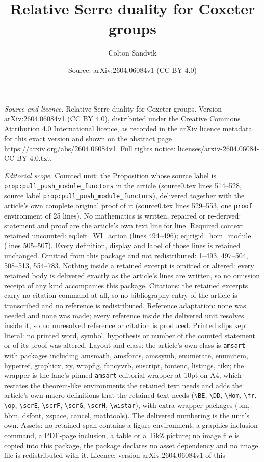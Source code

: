 \documentclass[10pt,a4paper]{amsart}
\title[Relative Serre duality for Coxeter groups]{Relative Serre duality for Coxeter groups}
\author{Colton Sandvik}
\date{Source: arXiv:2604.06084v1 (CC BY 4.0)}
\begin{document}
\maketitle

\noindent\emph{Source and licence.} Relative Serre duality for Coxeter groups. Version arXiv:2604.06084v1 (CC BY 4.0), distributed under the Creative Commons Attribution 4.0 International licence, as recorded in the arXiv licence metadata for this exact version and shown on the abstract page https://arxiv.org/abs/2604.06084v1. Full rights notice: licenses/arxiv-2604.06084-CC-BY-4.0.txt.\par\smallskip

\noindent\textit{Editorial scope.} Counted unit: the Proposition whose source label is \texttt{prop:pull\_push\_module\_functors} in the article (source0.tex lines 514--528, source label \texttt{prop:pull\_push\_module\_functors}), delivered together with the article's own complete original proof of it (source0.tex lines 529--553, one \texttt{proof} environment of 25 lines). No mathematics is written, repaired or re-derived: statement and proof are the article's own text line for line. Required context retained uncounted: eq:left\_WI\_action (lines 494--496); eq:rigid\_hom\_module (lines 505--507). Every definition, display and label of those lines is retained unchanged. Omitted from this package and not redistributed: 1--493, 497--504, 508--513, 554--783. Nothing inside a retained excerpt is omitted or altered: every retained body is delivered exactly as the article's lines are written, so no omission receipt of any kind accompanies this package. Citations: the retained excerpts carry no citation command at all, so no bibliography entry of the article is transcribed and no reference is redistributed. Reference adaptation: none was needed and none was made; every reference inside the delivered unit resolves inside it, so no unresolved reference or citation is produced. Printed slips kept literal: no printed word, symbol, hypothesis or number of the counted statement or of its proof was altered. Layout and class: the article's own class is \texttt{amsart} with packages including amsmath, amsfonts, amssymb, enumerate, enumitem, hyperref, graphicx, xy, wrapfig, fancyvrb, euscript, fontenc, listings, tikz; the wrapper is the lane's pinned \texttt{amsart} editorial wrapper at 10pt on A4, which restates the theorem-like environments the retained text needs and adds the article's own macro definitions that the retained text needs (\texttt{\textbackslash BE}, \texttt{\textbackslash DD}, \texttt{\textbackslash Hom}, \texttt{\textbackslash fr}, \texttt{\textbackslash op}, \texttt{\textbackslash scrE}, \texttt{\textbackslash scrF}, \texttt{\textbackslash scrG}, \texttt{\textbackslash scrH}, \texttt{\textbackslash wistar}), with extra wrapper packages (bm, bbm, dsfont, xspace, cancel, mathtools). The delivered numbering is the unit's own. Assets: no retained span contains a figure environment, a graphics-inclusion command, a PDF-page inclusion, a table or a TikZ picture; no image file is copied into this package, the package declares no asset dependency and no image file is redistributed with it. Licence: version arXiv:2604.06084v1 of this 
\end{document}
